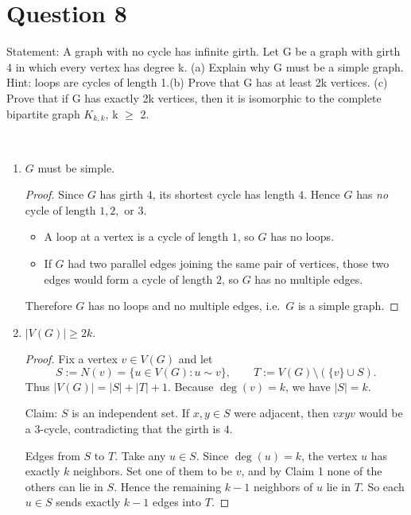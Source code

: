 \documentclass[11pt]{article}
\begin{document}
\newpage

\section*{Question 8}

Statement:  A graph with no cycle has infinite girth. Let G be a graph with girth 4 in which every vertex has degree k. (a) Explain why G must be a simple graph. Hint: loops are cycles of length 1.(b) Prove that G has at least 2k vertices. (c) Prove that if G has exactly 2k vertices, then it is isomorphic to the complete bipartite graph $K_{k,k}$, k $\geq$ 2.

~

\begin{enumerate}
    \item $G$ must be simple.


\begin{proof}
Since $G$ has girth $4$, its shortest cycle has length $4$. Hence $G$ has \emph{no} cycle of
length $1,2,$ or $3$.

\begin{itemize}
\item A loop at a vertex is a cycle of length $1$, so $G$ has no loops.
\item If $G$ had two parallel edges joining the same pair of vertices, those two edges would
form a cycle of length $2$, so $G$ has no multiple edges.
\end{itemize}

Therefore $G$ has no loops and no multiple edges, i.e.\ $G$ is a simple graph.
\end{proof}

\item $|V(G)|\ge 2k$.

\begin{proof}
Fix a vertex $v\in V(G)$ and let
\[
S := N(v)=\{u\in V(G): u\sim v\},\qquad T := V(G)\setminus(\{v\}\cup S).
\]
Thus $|V(G)|=|S|+|T|+1$. Because $\deg(v)=k$, we have $|S|=k$.

\medskip
\noindent Claim: $S$ is an independent set.
If $x,y\in S$ were adjacent, then $vxyv$ would be a $3$-cycle, contradicting that the girth is $4$.

\medskip
\noindent Edges from $S$ to $T$.
Take any $u\in S$. Since $\deg(u)=k$, the vertex $u$ has exactly $k$ neighbors.
Set one of them to be $v$, and by Claim 1 none of the others can lie in $S$.
Hence the remaining $k-1$ neighbors of $u$ lie in $T$.
So each $u\in S$ sends exactly $k-1$ edges into $T$.


\end{proof}
\end{enumerate}
\end{document}
